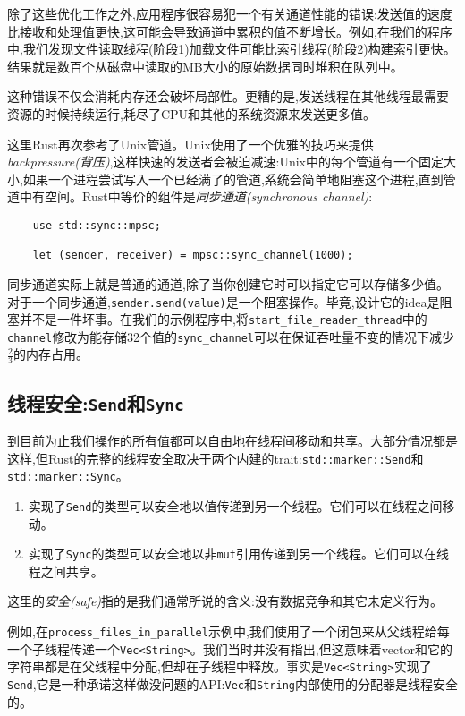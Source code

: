 除了这些优化工作之外,应用程序很容易犯一个有关通道性能的错误:发送值的速度比接收和处理值更快,这可能会导致通道中累积的值不断增长。例如,在我们的程序中,我们发现文件读取线程(阶段1)加载文件可能比索引线程(阶段2)构建索引更快。结果就是数百个从磁盘中读取的MB大小的原始数据同时堆积在队列中。

这种错误不仅会消耗内存还会破坏局部性。更糟的是,发送线程在其他线程最需要资源的时候持续运行,耗尽了CPU和其他的系统资源来发送更多值。

这里Rust再次参考了Unix管道。Unix使用了一个优雅的技巧来提供\emph{backpressure(背压)},这样快速的发送者会被迫减速:Unix中的每个管道有一个固定大小,如果一个进程尝试写入一个已经满了的管道,系统会简单地阻塞这个进程,直到管道中有空间。Rust中等价的组件是\emph{同步通道(synchronous channel)}:
\begin{verbatim}
    use std::sync::mpsc;

    let (sender, receiver) = mpsc::sync_channel(1000);
\end{verbatim}

同步通道实际上就是普通的通道,除了当你创建它时可以指定它可以存储多少值。对于一个同步通道,\texttt{sender.send(value)}是一个阻塞操作。毕竟,设计它的idea是阻塞并不是一件坏事。在我们的示例程序中,将\texttt{start\_file\_reader\_thread}中的\texttt{channel}修改为能存储32个值的\texttt{sync\_channel}可以在保证吞吐量不变的情况下减少$\frac{2}{3}$的内存占用。

\subsection{线程安全:\texttt{Send}和\texttt{Sync}}\label{threadsafe}
到目前为止我们操作的所有值都可以自由地在线程间移动和共享。大部分情况都是这样,但Rust的完整的线程安全取决于两个内建的trait:\texttt{std::marker::Send}和\texttt{std::marker::Sync}。

\begin{enumerate}
    \item 实现了\texttt{Send}的类型可以安全地以值传递到另一个线程。它们可以在线程之间移动。
    \item 实现了\texttt{Sync}的类型可以安全地以非\texttt{mut}引用传递到另一个线程。它们可以在线程之间共享。
\end{enumerate}

这里的\emph{安全(safe)}指的是我们通常所说的含义:没有数据竞争和其它未定义行为。

例如,在\texttt{process\_files\_in\_parallel}示例中,我们使用了一个闭包来从父线程给每一个子线程传递一个\texttt{Vec<String>}。我们当时并没有指出,但这意味着vector和它的字符串都是在父线程中分配,但却在子线程中释放。事实是\texttt{Vec<String>}实现了\texttt{Send},它是一种承诺这样做没问题的API:\texttt{Vec}和\texttt{String}内部使用的分配器是线程安全的。

